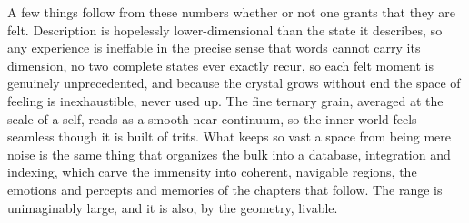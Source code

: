 A few things follow from these numbers whether or not one grants that they are felt. Description is hopelessly lower-dimensional than the state it describes, so any experience is ineffable in the precise sense that words cannot carry its dimension, no two complete states ever exactly recur, so each felt moment is genuinely unprecedented, and because the crystal grows without end the space of feeling is inexhaustible, never used up. The fine ternary grain, averaged at the scale of a self, reads as a smooth near-continuum, so the inner world feels seamless though it is built of trits. What keeps so vast a space from being mere noise is the same thing that organizes the bulk into a database, integration and indexing, which carve the immensity into coherent, navigable regions, the emotions and percepts and memories of the chapters that follow. The range is unimaginably large, and it is also, by the geometry, livable.
